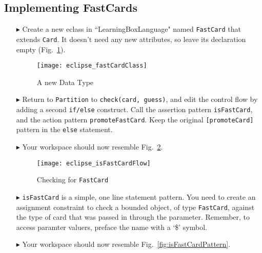 \newpage
\subsection{Implementing FastCards}
\texHeader
\hypertarget{fastCard tex}{}

\begin{itemize}
  
\item[$\blacktriangleright$] Create a new eclass in ``LearningBoxLanguage" named \texttt{FastCard} that extends \texttt{Card}. It doesn't need any new
attributes, so leave its declaration empty (Fig.~\ref{fig:fastClass}).

\begin{figure}[htp]
\begin{center}
  \texttt{[image: eclipse\_fastCardClass]}
  \caption{A new Data Type}
  \label{fig:fastClass}
\end{center}
\end{figure}

\item[$\blacktriangleright$] Return to \texttt{Partition} to \texttt{check(card, guess)}, and edit the control flow by adding a second \texttt{if/else}
construct. Call the assertion pattern \texttt{isFastCard}, and the action pattern \texttt{promoteFastCard}. Keep the original \texttt{[promoteCard]} pattern in
the \texttt{else} statement.

\item[$\blacktriangleright$] Your workspace should now resemble Fig.~\ref{fig:isFastCard}.

\begin{figure}[htp]
\begin{center}
  \texttt{[image: eclipse\_isFastCardFlow]}
  \caption{Checking for \texttt{FastCard}}
  \label{fig:isFastCard}
\end{center}
\end{figure}

\item[$\blacktriangleright$] \texttt{isFastCard} is a simple, one line statement pattern. You need to create an assignment constraint to check a bounded object,
of type \texttt{FastCard}, against the type of card that was passed in through the parameter. Remember, to access paramter valuers, preface the name with a `\$'
symbol.

\item[$\blacktriangleright$] Your workspace should now resemble Fig.~\ref{fig:isFastCardPattern}.


\end{itemize}
